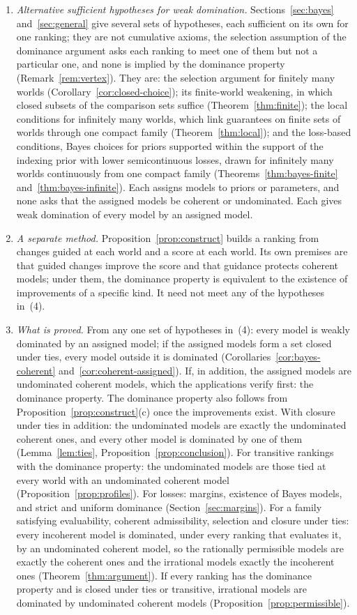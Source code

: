 \documentclass[11pt]{article}
\theoremstyle{definition}
\theoremstyle{remark}
\begin{document}
\begin{enumerate}[label=(\arabic*),leftmargin=*]
\item \emph{Alternative sufficient hypotheses for weak domination.} Sections~\ref{sec:bayes} and~\ref{sec:general} give several sets of hypotheses, each sufficient on its own for one ranking; they are not cumulative axioms, the selection assumption of the dominance argument asks each ranking to meet one of them but not a particular one, and none is implied by the dominance property (Remark~\ref{rem:vertex}). They are: the selection argument for finitely many worlds (Corollary~\ref{cor:closed-choice}); its finite-world weakening, in which closed subsets of the comparison sets suffice (Theorem~\ref{thm:finite}); the local conditions for infinitely many worlds, which link guarantees on finite sets of worlds through one compact family (Theorem~\ref{thm:local}); and the loss-based conditions, Bayes choices for priors supported within the support of the indexing prior with lower semicontinuous losses, drawn for infinitely many worlds continuously from one compact family (Theorems~\ref{thm:bayes-finite} and~\ref{thm:bayes-infinite}). Each assigns models to priors or parameters, and none asks that the assigned models be coherent or undominated. Each gives weak domination of every model by an assigned model.
\item \emph{A separate method.} Proposition~\ref{prop:construct} builds a ranking from changes guided at each world and a score at each world. Its own premises are that guided changes improve the score and that guidance protects coherent models; under them, the dominance property is equivalent to the existence of improvements of a specific kind. It need not meet any of the hypotheses in~(4).
\item \emph{What is proved.} From any one set of hypotheses in~(4): every model is weakly dominated by an assigned model; if the assigned models form a set closed under ties, every model outside it is dominated (Corollaries~\ref{cor:bayes-coherent} and~\ref{cor:coherent-assigned}). If, in addition, the assigned models are undominated coherent models, which the applications verify first: the dominance property. The dominance property also follows from Proposition~\ref{prop:construct}(c) once the improvements exist. With closure under ties in addition: the undominated models are exactly the undominated coherent ones, and every other model is dominated by one of them (Lemma~\ref{lem:ties}, Proposition~\ref{prop:conclusion}). For transitive rankings with the dominance property: the undominated models are those tied at every world with an undominated coherent model (Proposition~\ref{prop:profiles}). For losses: margins, existence of Bayes models, and strict and uniform dominance (Section~\ref{sec:margins}). For a family satisfying evaluability, coherent admissibility, selection and closure under ties: every incoherent model is dominated, under every ranking that evaluates it, by an undominated coherent model, so the rationally permissible models are exactly the coherent ones and the irrational models exactly the incoherent ones (Theorem~\ref{thm:argument}). If every ranking has the dominance property and is closed under ties or transitive, irrational models are dominated by undominated coherent models (Proposition~\ref{prop:permissible}).

\end{enumerate}
\end{document}
